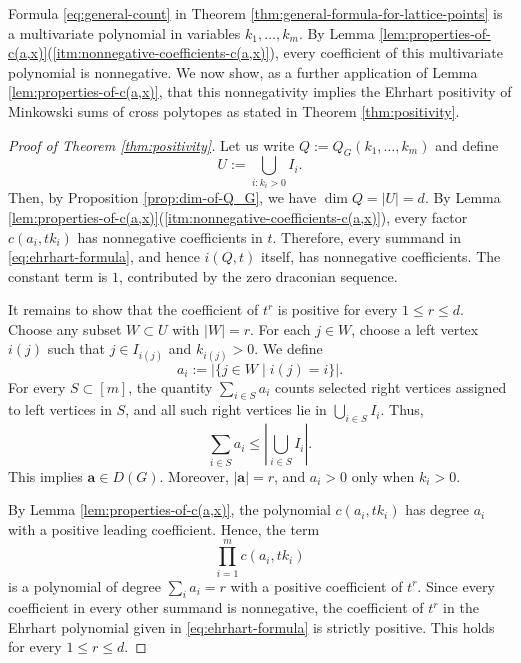 \documentclass[11pt,a4paper]{article}
\newcommand{\vct}[1]{\boldsymbol{#1}}
\newcommand{\1}{\mathbf{1}}
\theoremstyle{plain}
\theoremstyle{definition}
\begin{document}
Formula \eqref{eq:general-count} in Theorem \ref{thm:general-formula-for-lattice-points} is a multivariate polynomial in variables $k_1, \dots, k_m$. By Lemma \ref{lem:properties-of-c(a,x)}(\ref{itm:nonnegative-coefficients-c(a,x)}), every coefficient of this multivariate polynomial is nonnegative. We now show, as a further application of Lemma \ref{lem:properties-of-c(a,x)}, that this nonnegativity implies the Ehrhart positivity of Minkowski sums of cross polytopes as stated in Theorem \ref{thm:positivity}.
\begin{proof}[Proof of Theorem \ref{thm:positivity}] Let us write $Q:=Q_G(k_1,\dots, k_m)$ and define $$U:=\bigcup_{i:k_i>0}I_i.$$ Then, by Proposition \ref{prop:dim-of-Q_G}, we have $\dim Q=|U|=d$. By Lemma \ref{lem:properties-of-c(a,x)}(\ref{itm:nonnegative-coefficients-c(a,x)}), every factor $c(a_i,tk_i)$ has nonnegative coefficients in $t$. Therefore, every summand in \eqref{eq:ehrhart-formula}, and hence $i(Q,t)$ itself, has nonnegative coefficients. The constant term is $1$, contributed by the zero draconian sequence.

It remains to show that the coefficient of $t^r$ is positive for every $1\le r\le d$. Choose any subset $W\subset U$ with $|W|=r$. For each $j\in W$, choose a left vertex $i(j)$ such that $j\in I_{i(j)}$ and $k_{i(j)}>0$. We define
\[
a_i:=|\{j\in W\mid i(j)=i\}|.
\]
For every $S\subset[m]$, the quantity $\sum_{i\in S}a_i$ counts selected right vertices assigned to left vertices in $S$, and all such right vertices lie in $\bigcup_{i\in S}I_i$. Thus,
\[
\sum_{i\in S}a_i\le\left|\bigcup_{i\in S}I_i\right|.
\]
This implies $\vct{a}\in D(G)$. Moreover, $|\vct{a}|=r$, and $a_i>0$ only when $k_i>0$.

By Lemma \ref{lem:properties-of-c(a,x)}, the polynomial $c(a_i,tk_i)$ has degree $a_i$ with a positive leading coefficient. Hence, the term
\[
\prod_{i=1}^m c(a_i,tk_i)
\]
is a polynomial of degree $\sum_i a_i=r$ with a positive coefficient of $t^r$. Since every coefficient in every other summand is nonnegative, the coefficient of $t^r$ in the Ehrhart polynomial given in \eqref{eq:ehrhart-formula} is strictly positive. This holds for every $1\le r\le d$.
\end{proof}
\end{document}
